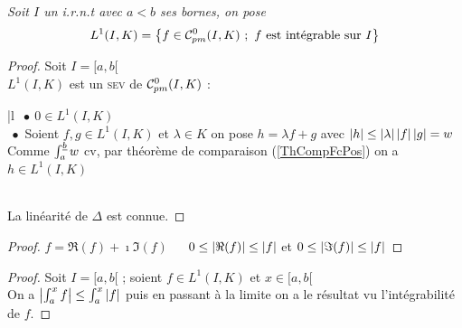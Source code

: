 	\emph{Soit $I$ un i.r.n.t avec $a<b$ ses bornes, on pose}
	\[
		L^1(I,K) = \big\{f\in{\mathcal{C}_{pm}^0}(I,K) ~;~f \text{ est intégrable sur } I \big\}
	\]
	
	
	\begin{proof} Soit $I=[a,b[$ \vspace*{0.2cm}\\
		$L^1(I,K)$ est un \textsc{sev} de ${\mathcal{C}_{pm}^0}(I,K)$ : \\ 
		\hspace*{0.5cm}\begin{blockarray}{|l}
			$~\bullet ~0\in L^1(I,K)$ \\ 
			$~\bullet$ Soient $f,g\in L^1(I,K)$ et $\lambda\in K$ on pose $h=\lambda f+g$ avec $\left\vert h \right\vert\leq \left\vert \lambda \right\vert\left\vert f \right\vert\left\vert g \right\vert = w$ \\ 
			Comme $\int_a^{\uline{b}} w$ cv, par théorème de comparaison (\ref{ThCompFcPos}) on a $h\in L^1(I,K)$  
		\end{blockarray}\\
		La linéarité de $\Delta$ est connue.
	\end{proof} \medskip
	
	
	\begin{proof}
		\fbox{$\Leftarrow$} $f=\Re(f)+\imath \Im(f)$ $~~~~$ \fbox{$\Rightarrow$} $0\leq\left\vert \Re(f) \right\vert \leq \left\vert f \right\vert$ et $0\leq\left\vert \Im(f) \right\vert\leq\left\vert f \right\vert$
	\end{proof} \medskip
	
	
	
	\begin{proof}
		Soit $I=[a,b[$ ; soient $f\in L^1(I,K)$ et $x\in [a,b[$\\
		On a $\left\vert \int_a^x f \right\vert \leq \int_a^x \left\vert f \right\vert$ puis en passant à la limite on a le résultat vu l'intégrabilité de $f$.
	\end{proof} \medskip
	

